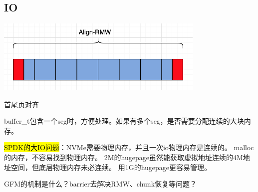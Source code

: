 \subsection{IO}

\begin{center}
\includegraphics[width=10cm]{../imgs/io-align.png}
\end{center}

首尾页对齐

buffer\_t包含一个seg时，方便处理。如果有多个seg，是否需要分配连续的大块内存。

\hl{SPDK的大IO问题}：NVMe需要物理内存，并且一次io物理内存是连续的。
malloc的内存，不容易找到物理内存。
2M的hugepage虽然能获取虚拟地址连续的4M地址空间，但底层物理内存未必连续。
用1G的hugepage更容易管理。

GFM的机制是什么？barrier去解决RMW、chunk恢复等问题？
